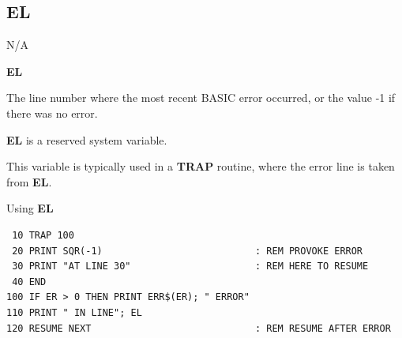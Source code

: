 \subsection{EL}
\begin{description}[leftmargin=2cm,style=nextline]
\item [Token:]    N/A

\item [Format:]   {\bf EL}

\item [Usage:]    The line number where the most recent BASIC error occurred, or the value -1 if there was no error.

\item [Remarks:]  {\bf EL} is a reserved system variable.

                  This variable is typically used in a {\bf TRAP} routine, where the error line is taken from {\bf EL}.

\item [Example:]  Using {\bf EL}

\begin{tcolorbox}[colback=black,coltext=white]
\verbatimfont{\codefont}
\begin{verbatim}
 10 TRAP 100
 20 PRINT SQR(-1)                           : REM PROVOKE ERROR
 30 PRINT "AT LINE 30"                      : REM HERE TO RESUME
 40 END
100 IF ER > 0 THEN PRINT ERR$(ER); " ERROR"
110 PRINT " IN LINE"; EL
120 RESUME NEXT                             : REM RESUME AFTER ERROR
\end{verbatim}
\end{tcolorbox}
\end{description}


\newpage
